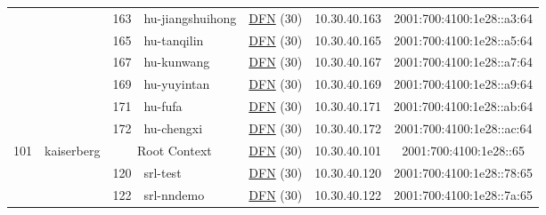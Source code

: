 \begin{small}
\begin{center}
\begin{longtable}{|c|c|c|c|c|c|c|c|}
  &  & \tiny{163} & \multicolumn{1}{|l|}{\tiny{hu-jiangshuihong}} & \multicolumn{2}{|c|}{\tiny{\href{https://www.dfn.de}{DFN} (30)}} & \tiny{10.30.40.163} & \tiny{2001:700:4100:1e28::a3:64} \\* \cline{3-3}\cline{4-4}\cline{5-5}\cline{6-6}\cline{7-7}\cline{8-8}
  &  & \tiny{165} & \multicolumn{1}{|l|}{\tiny{hu-tanqilin}} & \multicolumn{2}{|c|}{\tiny{\href{https://www.dfn.de}{DFN} (30)}} & \tiny{10.30.40.165} & \tiny{2001:700:4100:1e28::a5:64} \\* \cline{3-3}\cline{4-4}\cline{5-5}\cline{6-6}\cline{7-7}\cline{8-8}
  &  & \tiny{167} & \multicolumn{1}{|l|}{\tiny{hu-kunwang}} & \multicolumn{2}{|c|}{\tiny{\href{https://www.dfn.de}{DFN} (30)}} & \tiny{10.30.40.167} & \tiny{2001:700:4100:1e28::a7:64} \\* \cline{3-3}\cline{4-4}\cline{5-5}\cline{6-6}\cline{7-7}\cline{8-8}
  &  & \tiny{169} & \multicolumn{1}{|l|}{\tiny{hu-yuyintan}} & \multicolumn{2}{|c|}{\tiny{\href{https://www.dfn.de}{DFN} (30)}} & \tiny{10.30.40.169} & \tiny{2001:700:4100:1e28::a9:64} \\* \cline{3-3}\cline{4-4}\cline{5-5}\cline{6-6}\cline{7-7}\cline{8-8}
  &  & \tiny{171} & \multicolumn{1}{|l|}{\tiny{hu-fufa}} & \multicolumn{2}{|c|}{\tiny{\href{https://www.dfn.de}{DFN} (30)}} & \tiny{10.30.40.171} & \tiny{2001:700:4100:1e28::ab:64} \\* \cline{3-3}\cline{4-4}\cline{5-5}\cline{6-6}\cline{7-7}\cline{8-8}
  &  & \tiny{172} & \multicolumn{1}{|l|}{\tiny{hu-chengxi}} & \multicolumn{2}{|c|}{\tiny{\href{https://www.dfn.de}{DFN} (30)}} & \tiny{10.30.40.172} & \tiny{2001:700:4100:1e28::ac:64} \\ \hline
 \multirow{27}{*}{\tiny{101}} & \multicolumn{1}{|l|}{\multirow{27}{*}{\tiny{kaiserberg}}} & \multicolumn{2}{|c|}{\tiny{Root Context}} & \multicolumn{2}{|c|}{\tiny{\href{https://www.dfn.de}{DFN} (30)}} & \tiny{10.30.40.101} & \tiny{2001:700:4100:1e28::65} \\* \cline{3-3}\cline{4-4}\cline{5-5}\cline{6-6}\cline{7-7}\cline{8-8}
  &  & \tiny{120} & \multicolumn{1}{|l|}{\tiny{srl-test}} & \multicolumn{2}{|c|}{\tiny{\href{https://www.dfn.de}{DFN} (30)}} & \tiny{10.30.40.120} & \tiny{2001:700:4100:1e28::78:65} \\* \cline{3-3}\cline{4-4}\cline{5-5}\cline{6-6}\cline{7-7}\cline{8-8}
  &  & \tiny{122} & \multicolumn{1}{|l|}{\tiny{srl-nndemo}} & \multicolumn{2}{|c|}{\tiny{\href{https://www.dfn.de}{DFN} (30)}} & \tiny{10.30.40.122} & \tiny{2001:700:4100:1e28::7a:65} \\* \cline{3-3}\cline{4-4}\cline{5-5}\cline{6-6}\cline{7-7}\cline{8-8}

\end{longtable}
\end{center}
\end{small}
